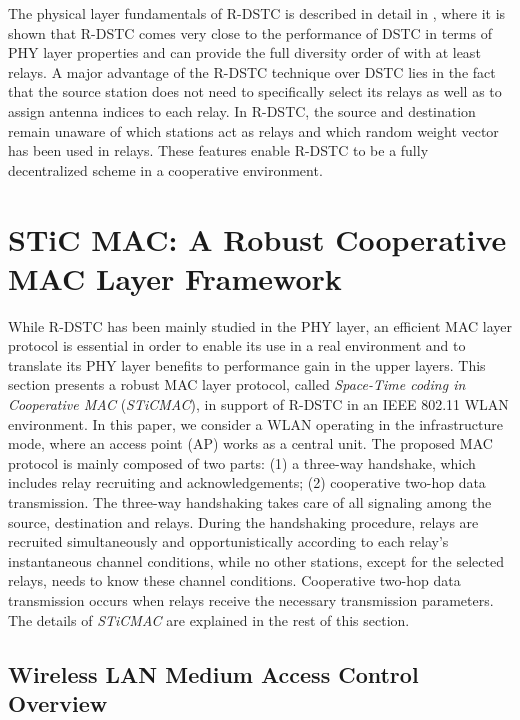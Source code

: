 \documentclass[peerreview,draftcls,onecolumn,12pt,a4paper]{IEEEtran}
\begin{document}
The physical layer fundamentals of R-DSTC is described in detail
in \cite{sirkeci_scaglione_mergen_2007_SP}, where it is shown that
R-DSTC comes very close to the performance of DSTC in terms of PHY
layer properties and can provide the full diversity order of 
with at least  relays. A major advantage of the R-DSTC
technique over DSTC lies in the fact that the source station does
not need to specifically select its relays as well as to assign
antenna indices to each relay. In R-DSTC, the source and
destination remain unaware of which stations act as relays and
which random weight vector has been used in relays. These features
enable R-DSTC to be a fully decentralized scheme in a cooperative
environment.


\vspace{-0.2in}
\section{ST\MakeLowercase{i}C MAC: A Robust Cooperative MAC Layer Framework}
\label{WLAN-MAC-R-DSTC}

While R-DSTC has been mainly studied in
the PHY layer, an efficient MAC layer protocol is essential in
order to enable its use in a real environment and to translate its
PHY layer benefits to performance gain in the upper layers. This
section presents a robust MAC layer protocol, called
\emph{Space-Time coding in Cooperative MAC} (\emph{STiCMAC}), in
support of R-DSTC in an IEEE 802.11 WLAN environment. In this
paper, we consider a WLAN operating in the infrastructure mode,
where an access point (AP) works as a central unit. The proposed
MAC protocol is mainly composed of two parts: (1) a three-way
handshake, which includes relay recruiting and acknowledgements;
(2) cooperative two-hop data transmission. The three-way
handshaking takes care of all signaling among the source,
destination and relays. During the handshaking procedure, relays
are recruited simultaneously and opportunistically according to
each relay's instantaneous channel conditions, while no other stations, except for the selected relays, needs to know these channel conditions. Cooperative two-hop data
transmission occurs when relays receive the necessary transmission
parameters. The details of \emph{STiCMAC} are explained in the
rest of this section.

\vspace{-0.15in}
\subsection{Wireless LAN Medium Access Control Overview}
\label{WLAN-DCF}
\vspace{-0.05in}
\end{document}
